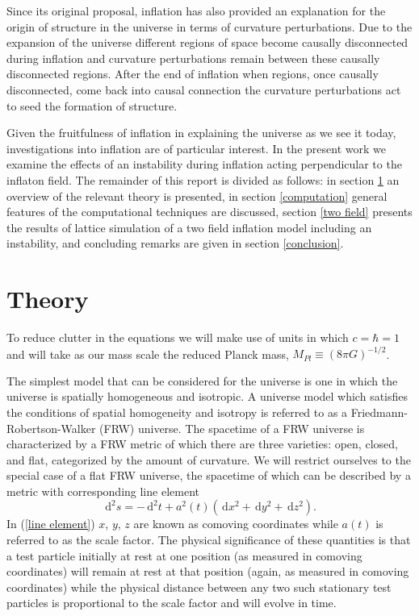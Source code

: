 \documentclass[letterpaper,11pt]{article}
\newcommand{\ud}{\,\mathrm{d}}
\begin{document}
Since its original proposal, inflation has also provided an explanation for the origin of structure in the universe in terms of curvature perturbations. Due to the expansion of the universe different regions of space become causally disconnected during inflation and curvature perturbations remain between these causally disconnected regions. After the end of inflation when regions, once causally disconnected, come back into causal connection the curvature perturbations act to seed the formation of structure.\cite{liddle}

Given the fruitfulness of inflation in explaining the universe as we see it today, investigations into inflation are of particular interest. In the present work we examine the effects of an instability during inflation acting perpendicular to the inflaton field. The remainder of this report is divided as follows: in section \ref{theory} an overview of the relevant theory is presented, in section \ref{computation} general features of the computational techniques are discussed, section \ref{two field} presents the results of lattice simulation of a two field inflation model including an instability, and concluding remarks are given in section \ref{conclusion}.

\section{Theory} \label{theory}
To reduce clutter in the equations we will make use of units in which $c=\hbar=1$ and will take as our mass scale the reduced Planck mass, $M_{Pl}\equiv (8\pi G)^{-1/2}$.

The simplest model that can be considered for the universe is one in which the universe is spatially homogeneous and isotropic. A universe model which satisfies the conditions of spatial homogeneity and isotropy is referred to as a Friedmann-Robertson-Walker (FRW) universe. The spacetime of a FRW universe is characterized by a FRW metric of which there are three varieties: open, closed, and flat, categorized by the amount of curvature. We will restrict ourselves to the special case of a flat FRW universe, the spacetime of which can be described by a metric with corresponding line element
\begin{equation}
\ud^2s=-\ud^2t+a^2(t)(\ud x^2+\ud y^2+\ud z^2). \label{line element}
\end{equation}
In (\ref{line element}) $x$, $y$, $z$ are known as comoving coordinates while $a(t)$ is referred to as the scale factor. The physical significance of these quantities is that a test particle initially at rest at one position (as measured in comoving coordinates) will remain at rest at that position (again, as measured in comoving coordinates) while the physical distance between any two such stationary test particles is proportional to the scale factor and will evolve in time.
\end{document}
